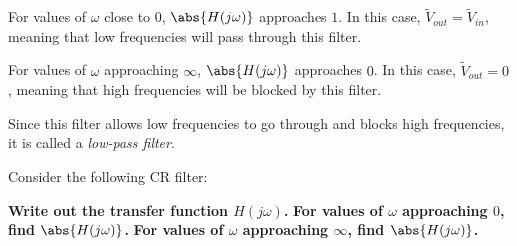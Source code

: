 \begin{enumerate}
{\begin{enumerate}
  \qitem For values of $\omega$ close to $0$, $\abs{H(j\omega)}$ approaches $1$.
    In this case, $\widetilde{V}_{out} = \widetilde{V}_{in}$, meaning that low frequencies will pass through this filter.

  \qitem For values of $\omega$ approaching $\infty$, $\abs{H(j\omega)}$ approaches $0$.
    In this case, $\widetilde{V}_{out} = 0$, meaning that high frequencies will be blocked by this filter.
    
    \vspace{0.1 cm} 

    Since this filter allows low frequencies to go through and blocks high frequencies, it is called a \emph{low-pass filter}.

\end{enumerate}
}

\newpage

\qitem Consider the following CR filter:



\begin{enumerate}
  \qitem \textbf{Write out the transfer function $H(j \omega)$.}
  \ws{\vspace{40px}}
  \qitem \textbf{For values of $\omega$ approaching $0$, find $\abs{H(j \omega)}$.}
  \ws{\vspace{35px}}
  \qitem \textbf{For values of $\omega$ approaching $\infty$, find $\abs{H(j \omega)}$.}
  \ws{\vspace{35px}}
\end{enumerate}

\end{enumerate}
